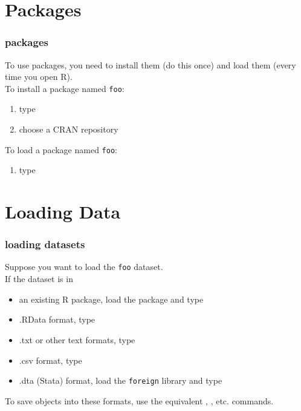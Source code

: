 \documentclass[handout]{beamer}
\newcommand{\red}{\color{red}}
\newcommand{\black}{\color{black}}
\begin{document}
\section{Packages}
\begin{frame}
\frametitle{packages}
To use packages, you need to install them (do this once) and load them (every time you open R).\\
\pause
\bigskip
To install a package named {\tt foo}:
\pause
\begin{enumerate}
\item type \red{\tt install.packages("foo")}\black
\pause
\item choose a CRAN repository
\end{enumerate}
\bigskip
\pause
To load a package named {\tt foo}:
\pause
\begin{enumerate}
\item type \red{\tt library(foo)}\black
\end{enumerate}
\end{frame}

\section{Loading Data}
\begin{frame}
\frametitle{loading datasets}
Suppose you want to load the {\tt foo} dataset. \\
\pause
\bigskip
If the dataset is in
\begin{itemize}
\item an existing R package, load the package and type \red{\tt data(foo)}\black
\pause
\item .RData format, type \red{\tt load(foo)}\black
\pause
\item .txt or other text formats, type \red{\tt read.table("foo.txt")}\black
\pause
\item .csv format, type \red{\tt read.csv("foo.csv")}\black
\pause
\item .dta (Stata) format, load the {\tt foreign} library and type \red{\tt read.dta("foo.dta")}\black
\end{itemize}
\pause
\bigskip
To save objects into these formats, use the equivalent \red {\tt write.table()}\black, \red{\tt write.csv()}\black, etc. commands. 
\end{frame}
\end{document}
